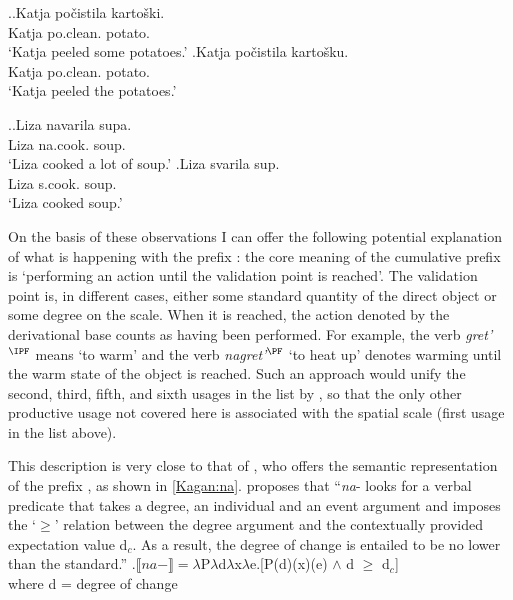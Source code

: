 \ex.\label{ex:na:po}\ag.\label{ex:na:po:gen}Katja po\v{c}istila karto\v{s}ki.\\
Katja po.clean. potato.\\
\trans `Katja peeled some potatoes.'
\bg.\label{ex:na:po:acc}Katja po\v{c}istila karto\v{s}ku.\\
Katja po.clean. potato.\\
\trans `Katja peeled the potatoes.'

\ex.\ag.\label{ex:navarit}Liza navarila supa.\\
Liza na.cook. soup.\\
\trans `Liza cooked a lot of soup.'
\bg.\label{ex:svarit}Liza svarila sup.\\
Liza s.cook. soup.\\
\trans `Liza cooked soup.'

On the basis of these observations I can offer the following potential explanation of what is happening with the prefix : the core meaning of the cumulative prefix  is `performing an action until the validation point is reached'. The validation point is, in different cases, either some standard quantity of the direct object or some degree on the scale. When it is reached, the action denoted by the derivational base counts as having been performed. For example, the verb \textit{gret'}$^{\IPF}$ means `to warm' and the verb \textit{nagret'}$^{\PF}$ `to heat up' denotes warming until the warm state of the object is reached. Such an approach would unify the second, third, fifth, and sixth usages in the list by \citet{Shvedova:82}, so that the only other productive usage not covered here is associated with the spatial scale (first usage in the list above). 

This description is very close to that of \citet{Kagan:book}, who offers the semantic representation of the prefix , as shown in \ref{Kagan:na}. \citet[55]{Kagan:book} proposes that ``\textit{na}- looks for a verbal predicate that takes a degree, an individual and an event argument and imposes the `$\geqslant$' relation between the degree argument and the contextually provided expectation value d$_c$. As a result, the degree of change is entailed to be no lower than the standard.''
\ex.\label{Kagan:na}$\llbracket na- \rrbracket = \lambda$P$\lambda$d$\lambda$x$\lambda$e.[P(d)(x)(e) $\wedge$ d $\geqslant$ d$_c$]\\
where d = degree of change \citep{KennedyLevin:02}\\

